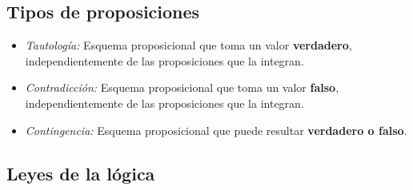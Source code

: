 \documentclass[a4paper, twoside]{article}
\begin{document}
\subsection{Tipos de proposiciones}
\begin{itemize}
	\item \emph{Tautología:} Esquema proposicional que toma un valor 
	\textbf{verdadero}, independientemente de las proposiciones que la integran.

	\item \emph{Contradicción:} Esquema proposicional que toma un valor 
	\textbf{falso}, independientemente de las proposiciones que la integran.

	\item \emph{Contingencia:} Esquema proposicional que puede resultar 
	\textbf{verdadero o falso}.
\end{itemize}

\subsection{Leyes de la lógica}
\end{document}
